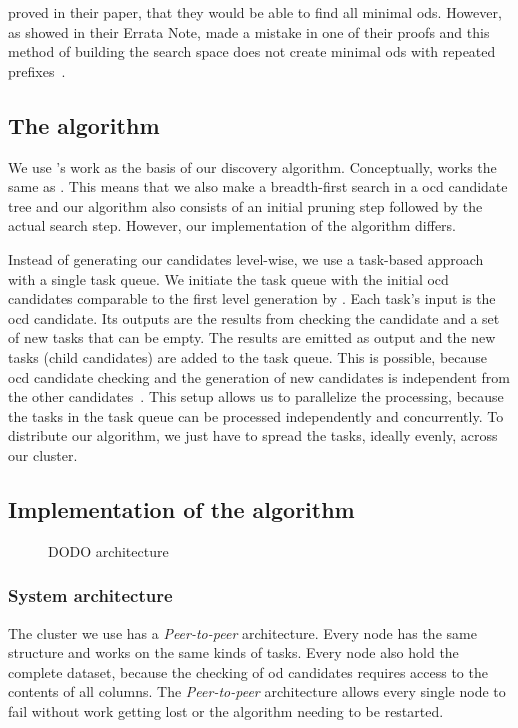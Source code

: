    proved in their paper, that they would be able to find all minimal \glspl{od}.
  However, as \citeauthor{szlichta:errata} showed in their Errata Note, \citeauthor{consonni} made a mistake in one of their proofs and this method of building the search space does not create minimal \glspl{od} with repeated prefixes~\cite{szlichta:errata}.

\subsection{The \dodo{} algorithm}\label{sec:dodo}

  We use \citeauthor{consonni}'s work as the basis of our discovery algorithm.
  Conceptually, \dodo{} works the same as \ocddiscover{}.
  This means that we also make a breadth-first search in a \gls{ocd} candidate tree and our algorithm also consists of an initial pruning step followed by the actual search step.
  However, our implementation of the algorithm differs.

  Instead of generating our candidates level-wise, we use a task-based approach with a single task queue.
  We initiate the task queue with the initial \gls{ocd} candidates comparable to the first level generation by \citeauthor{consonni}.
  Each task's input is the \gls{ocd} candidate.
  Its outputs are the results from checking the candidate and a set of new tasks that can be empty.
  The results are emitted as output and the new tasks (child candidates) are added to the task queue.
  This is possible, because \gls{ocd} candidate checking and the generation of new candidates is independent from the other candidates~\cite{consonni}.
  This setup allows us to parallelize the processing, because the tasks in the task queue can be processed independently and concurrently.
  To distribute our algorithm, we just have to spread the tasks, ideally evenly, across our cluster.

\subsection{Implementation of the \dodo{} algorithm}\label{sec:architecture}

  
  \begin{figure}
    \centering
    
    \caption{DODO architecture}
    \label{fig:dodo-architecture}
  \end{figure}

\subsubsection{System architecture}
The cluster we use has a \emph{Peer-to-peer} architecture.
Every node has the same structure and works on the same kinds of tasks.
Every node also hold the complete dataset, because the checking of \gls{od} candidates requires access to the contents of all columns.
The \emph{Peer-to-peer} architecture allows every single node to fail without work getting lost or the algorithm needing to be restarted.

